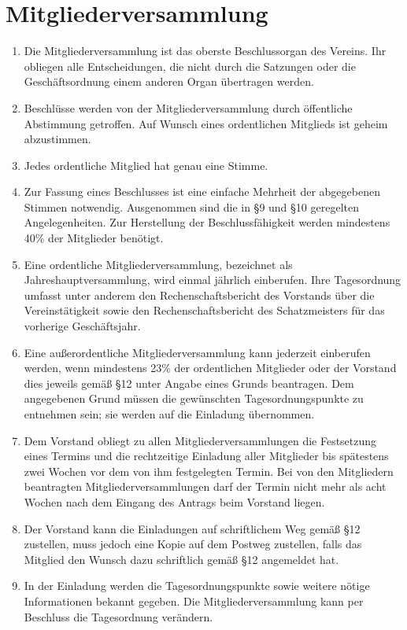 \documentclass[a4paper,DIV10,12pt,headsepline]{scrartcl}
\begin{document}
\section{Mitgliederversammlung}
\begin{enumerate}
	\item Die Mitgliederversammlung ist das oberste Beschlussorgan des Vereins. Ihr obliegen alle Entscheidungen, die nicht durch die Satzungen oder die Geschäftsordnung einem anderen Organ übertragen werden.
	\item Beschlüsse werden von der Mitgliederversammlung durch öffentliche Abstimmung getroffen. Auf Wunsch eines ordentlichen Mitglieds ist geheim abzustimmen.
	\item Jedes ordentliche Mitglied hat genau eine Stimme.
	\item Zur Fassung eines Beschlusses ist eine einfache Mehrheit der abgegebenen Stimmen notwendig. Ausgenommen sind die in \S 9 und  \S 10 geregelten Angelegenheiten. Zur Herstellung der Beschlussfähigkeit werden mindestens 40\% der Mitglieder benötigt.
	\item Eine ordentliche Mitgliederversammlung, bezeichnet als Jahreshauptversammlung, wird einmal jährlich einberufen. Ihre Tagesordnung umfasst unter anderem den Rechenschaftsbericht des Vorstands über die Vereinstätigkeit sowie den Rechenschaftsbericht des Schatzmeisters für das vorherige Geschäftsjahr.                                                 
	\item Eine außerordentliche Mitgliederversammlung kann jederzeit einberufen werden, wenn mindestens 23\% der ordentlichen Mitglieder oder der Vorstand dies jeweils gemäß \S 12 unter Angabe eines Grunds beantragen. Dem angegebenen Grund müssen die gewünschten Tagesordnungspunkte zu entnehmen sein; sie werden auf die Einladung übernommen.
	\item Dem Vorstand obliegt zu allen Mitgliederversammlungen die Festsetzung eines Termins und die rechtzeitige Einladung aller Mitglieder bis spätestens zwei Wochen vor dem von ihm festgelegten Termin. Bei von den Mitgliedern beantragten Mitgliederversammlungen darf der Termin nicht mehr als acht Wochen nach dem Eingang des Antrags beim Vorstand liegen.
	\item Der Vorstand kann die Einladungen auf schriftlichem Weg gemäß \S 12 zustellen, muss jedoch eine Kopie auf dem Postweg zustellen, falls das Mitglied den Wunsch dazu schriftlich gemäß \S 12 angemeldet hat.
	\item In der Einladung werden die Tagesordnungspunkte sowie weitere nötige Informationen bekannt gegeben. Die Mitgliederversammlung kann per Beschluss die Tagesordnung verändern.

\end{enumerate}
\end{document}
